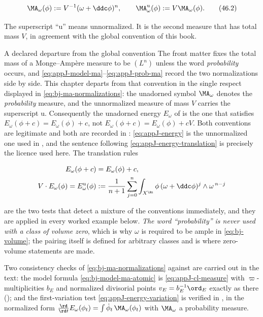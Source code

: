 \[
 \MA_\omega(\phi):=V^{-1}(\omega+\ddc\phi)^n,
 \qquad
 \MA^{\mathrm{u}}_\omega(\phi):=V\MA_\omega(\phi).
\tag{46.2}\label{eq:bj-ma-normalizations}
\]

The superscript ``u'' means unnormalized.  It is the second measure that
has total mass $V$, in agreement with the global convention of this book.

\begin{warning}{A declared departure from the global convention}
\label{warn:ch46-normalization}
The front matter fixes the total mass of a Monge--Amp\`ere measure to be
$(L^n)$ unless the word \emph{probability} occurs, and
\eqref{eq:appJ-model-ma}--\eqref{eq:appJ-prob-ma} record the two
normalizations side by side.  This chapter departs from that convention in
the single respect displayed in \eqref{eq:bj-ma-normalizations}: the
unadorned symbol $\MA_\omega$ denotes the \emph{probability} measure, and
the unnormalized measure of mass $V$ carries the superscript
$\mathrm u$.  Consequently the unadorned energy $E_\omega$ of
 is the one that satisfies
$E_\omega(\phi+c)=E_\omega(\phi)+c$, not
$E_\omega(\phi+c)=E_\omega(\phi)+cV$.  Both conventions are legitimate and
both are recorded in : \eqref{eq:appJ-energy} is the
unnormalized one used in , and the sentence following
\eqref{eq:appJ-energy-translation} is precisely the licence used here.  The
translation rules

\[
 \begin{aligned}
  E_\omega(\phi+c)&=E_\omega(\phi)+c,\\
  V\cdot E_\omega(\phi)=E^{\mathrm u}_\omega(\phi)
   &:=\frac{1}{n+1}\sum_{j=0}^{n}
     \int_{X^{\An}}\phi\,(\omega+\ddc\phi)^j
       \wedge\omega^{\,n-j}
 \end{aligned}
\]

are the two tests that detect a mixture of the conventions immediately, and
they are applied in every worked example below.  \emph{The word
``probability'' is never used with a class of volume zero}, which is why
$\omega$ is required to be ample in \eqref{eq:bj-volume}; the pairing
itself is defined for arbitrary classes and is where zero-volume statements
are made.
\end{warning}

Two consistency checks of \eqref{eq:bj-ma-normalizations} against
 are carried out in the text: the model formula
\eqref{eq:bj-model-ma-atomic} is \eqref{eq:appJ-cl-measure} with
$\varpi$-multiplicities $b_E$ and normalized divisorial points
$v_E=b_E^{-1}\ord_E$ exactly as there
(); and the first-variation test
\eqref{eq:appJ-energy-variation} is verified in
, in the normalized form
$\frac{\rd}{\rd t}E_\omega(\phi_t)=\int\dot\phi_t\,\MA_\omega(\phi_t)$
with $\MA_\omega$ a probability measure.

